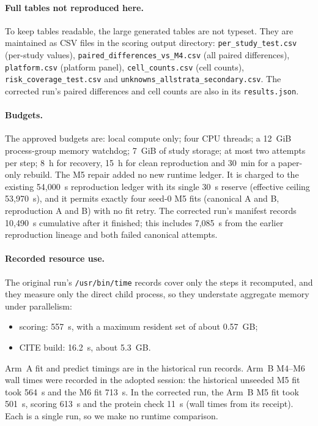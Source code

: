 \documentclass[11pt]{article}
\begin{document}
\paragraph{Full tables not reproduced here.} To keep tables readable, the large generated tables are not typeset. They are maintained as CSV files in the scoring output directory: \nolinkurl{per_study_test.csv} (per-study values), \nolinkurl{paired_differences_vs_M4.csv} (all paired differences), \nolinkurl{platform.csv} (platform panel), \nolinkurl{cell_counts.csv} (cell counts), \nolinkurl{risk_coverage_test.csv} and \nolinkurl{unknowns_allstrata_secondary.csv}. The corrected run's paired differences and cell counts are also in its \nolinkurl{results.json}.

\paragraph{Budgets.} The approved budgets are: local compute only; four CPU threads; a 12~GiB process-group memory watchdog; 7~GiB of study storage; at most two attempts per step; 8~h for recovery, 15~h for clean reproduction and 30~min for a paper-only rebuild. The M5 repair added no new runtime ledger. It is charged to the existing 54{,}000~s reproduction ledger with its single 30~s reserve (effective ceiling 53{,}970~s), and it permits exactly four seed-0 M5 fits (canonical A and B, reproduction A and B) with no fit retry. The corrected run's manifest records 10{,}490~s cumulative after it finished; this includes 7{,}085~s from the earlier reproduction lineage and both failed canonical attempts.

\paragraph{Recorded resource use.} The original run's \texttt{/usr/bin/time} records cover only the steps it recomputed, and they measure only the direct child process, so they understate aggregate memory under parallelism:
\begin{itemize}
\item scoring: 557~s, with a maximum resident set of about 0.57~GB;
\item CITE build: 16.2~s, about 5.3~GB.
\end{itemize}
Arm~A fit and predict timings are in the historical run records. Arm~B M4--M6 wall times were recorded in the adopted session: the historical unseeded M5 fit took 564~s and the M6 fit 713~s. In the corrected run, the Arm~B M5 fit took 501~s, scoring 613~s and the protein check 11~s (wall times from its receipt). Each is a single run, so we make no runtime comparison.
\end{document}
